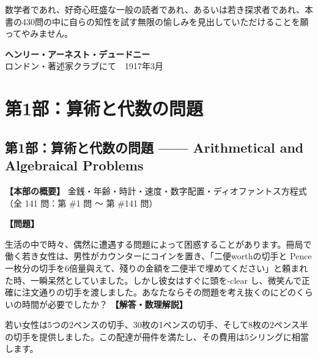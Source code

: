 \documentclass[10pt,a4paper,oneside,openany]{ltjsbook}
\begin{document}
数学者であれ、好奇心旺盛な一般の読者であれ、あるいは若き探求者であれ、本書の430問の中に自らの知性を試す無限の愉しみを見出していただけることを願ってやみません。

\begin{flushright}
\textbf{ヘンリー・アーネスト・デュードニー}\\
ロンドン・著述家クラブにて　1917年3月
\end{flushright}

\tableofcontents
\mainmatter
\part{第1部：算術と代数の問題}
\chapter*{第1部：算術と代数の問題 —— Arithmetical and Algebraical Problems}

\textbf{【本部の概要】} 金銭・年齢・時計・速度・数字配置・ディオファントス方程式（全 141 問：第 \#1 問 〜 第 \#141 問）

\vspace{1em}

\begin{tcolorbox}[colback=softblue,colframe=primaryblue,title=\textbf{第 1 問：郵便局の難問 （原題: A POST-OFFICE PERPLEXITY.）},arc=2mm,boxrule=1pt,breakable]
\textbf{【問題】}\par\vspace{0.3em}
生活の中で時々、偶然に遭遇する問題によって困惑することがあります。冊局で働く若き女性は、男性がカウンターにコインを置き、「二便worthの切手と Pence一枚分の切手を6倍量與えて、殘りの金額を二便半で埋めてください」と頼まれた時、一瞬呆然としていました。しかし彼女はすぐに頭を-clear し、微笑んで正確に注文通りの切手を渡しました。あなたならその問題を考え抜くのにどのくらいの時間が必要でしたか？
\tcblower
\textbf{【解答・数理解説】}\par\vspace{0.3em}
若い女性は5つの2ペンスの切手、30枚の1ペンスの切手、そして8枚の2ペンス半の切手を提供しました。この配達が冊件を満たし、その費用は5シリングに相當します。
\end{tcolorbox}
\end{document}
